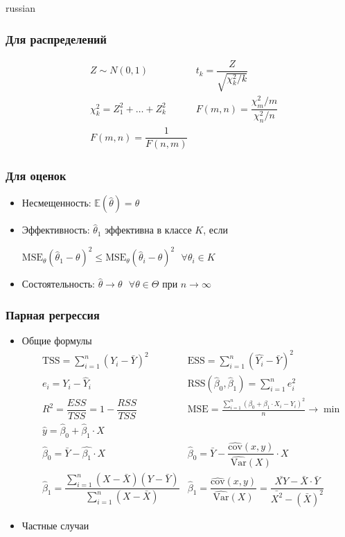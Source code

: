 \documentclass[9pt]{article}
\begin{document}
\begin{otherlanguage*}{russian}
\subsubsection*{Для распределений}
\begin{align*}
&Z \sim N(0,1 ) 
&t_k = \dfrac{Z}{\sqrt{\chi^2_k / k}} \\
&\chi^2_k = Z_1^2 + \ldots + Z_k^2 
&F(m, n) = \dfrac{\chi^2_m / m}{\chi^2_n / n} \\
&F(m, n) = \dfrac{1}{F(n, m)}
\end{align*}
\subsubsection*{Для оценок}
\begin{itemize}
\item Несмещенность: $ \mathbb{E} (\hat \theta) = \theta $
\item Эффективность: $ \hat \theta_1 $ эффективна в классе $ K $, если 

 $ \text{MSE}_{\theta }({\widehat {\theta }}_{1}-\theta )^{2}\le  \text{MSE}_{\theta }({ \widehat {\theta }}_{i}-\theta )^{2} \,\,\,\,\forall \theta_i \in K$
\item Состоятельность: $ \hat \theta \rightarrow \theta \,\,\,\, \forall \theta \in \Theta $ при $ n \rightarrow \infty $  
\end{itemize}
\subsubsection*{Парная регрессия}
\begin{itemize}
\item Общие формулы 
\begin{align*}
&\text{TSS} = \sum_{i=1}^n (Y_i - \bar{Y}) ^2 
&\text{ESS} = \sum_{i=1}^n (\hat{Y_i} - \bar{Y})^2  \\
&e_i = Y_i - \hat Y_i 
&\text{RSS} (\hat \beta_0, \hat \beta_1) = \sum_{i=1}^n e_i^2 \\
& R^2 = \dfrac{ESS}{TSS} = 1 - \dfrac{RSS}{TSS} 
& \text{MSE} = \frac{\sum_{i=1}^n (\beta_0 + \beta_1 \cdot X_i - Y_i)^2}{n} \rightarrow \min \\
&\hat y = \hat \beta_0 + \hat \beta_1 \cdot X \\
&\hat \beta_0 = \bar{Y} - \hat{\beta_1} \cdot X 
& \hat \beta_0 = \bar{Y} - \dfrac{\widehat{\text{cov}}(x, y)}{\widehat{\text{Var}}(X)} \cdot X \\
&\hat \beta_1 =\dfrac{\sum_{i=1}^n (X - \bar{X})(Y - \bar{Y})}{\sum_{i=1}^n (X - \bar{X})} &
\hat \beta_1 = \dfrac{\widehat{\text{cov}}(x, y)}{\widehat{\text{Var}}(X)} = \dfrac{\bar{X  Y} - \bar{X} \cdot \bar{Y}}{\bar{X^2} - (\bar{X})^2}
\end{align*}
\item Частные случаи


\end{itemize}
\end{otherlanguage*}
\end{document}
